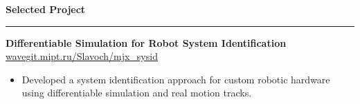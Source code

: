 \documentclass[11pt,a4paper]{article}
\newcommand{\cvsection}[1]{%
  \vspace{10pt}
  {\large\textbf{#1}}\\[-2pt]
  \hrule
  \vspace{6pt}
}
\begin{document}
\cvsection{Selected Project}
\textbf{Differentiable Simulation for Robot System Identification}\\
\href{https://wavegit.mipt.ru/Slavoch/mjx_sysid}{wavegit.mipt.ru/Slavoch/mjx\_sysid}
\begin{itemize}
  \item Developed a system identification approach for custom robotic hardware using differentiable simulation and real motion tracks.
\end{itemize}
\end{document}
